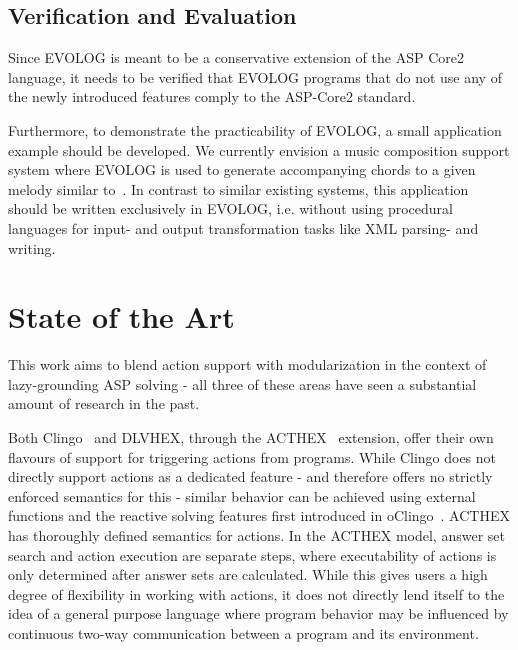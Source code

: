 \documentclass[12pt, letterpaper, twoside]{scrartcl}
\begin{document}
\subsection{Verification and Evaluation}

Since EVOLOG is meant to be a conservative extension of the ASP Core2 language, it needs to be verified that EVOLOG programs that do not use any of the newly introduced features comply to the ASP-Core2 standard.

Furthermore, to demonstrate the practicability of EVOLOG, a small application example should be developed. We currently envision a music composition support system where EVOLOG is used to generate accompanying chords to a given melody similar to~\cite{haspie}. In contrast to similar existing systems, this application should be written exclusively in EVOLOG, i.e. without using procedural languages for input- and output transformation tasks like XML parsing- and writing.

\section{State of the Art}

This work aims to blend action support with modularization in the context of lazy-grounding ASP solving - all three of these areas have seen a substantial amount of research in the past.

Both Clingo~\cite{clingo4} and DLVHEX, through the ACTHEX~\cite{acthex} extension, offer their own flavours of support for triggering actions from programs. While Clingo does not directly support actions as a dedicated feature - and therefore offers no strictly enforced semantics for this - similar behavior can be achieved using external functions and the reactive solving features first introduced in oClingo~\cite{oclingo}. ACTHEX has thoroughly defined semantics for actions. In the ACTHEX model, answer set search and action execution are separate steps, where executability of actions is only determined after answer sets are calculated. While this gives users a high degree of flexibility in working with actions, it does not directly lend itself to the idea of a general purpose language where program behavior may be influenced by continuous two-way communication between a program and its environment.
\end{document}
